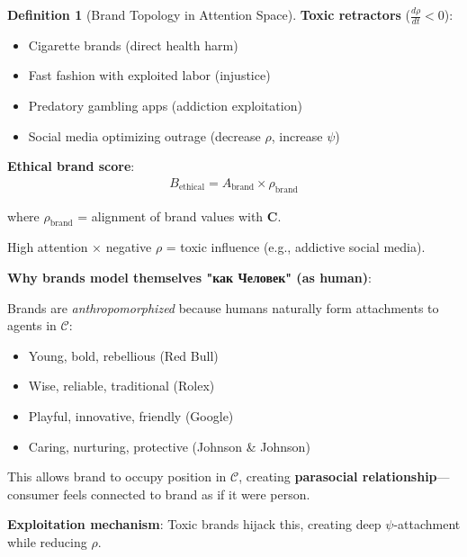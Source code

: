 \documentclass[11pt,a4paper]{article}
\theoremstyle{definition}
\newtheorem{definition}{Definition}[section]
\theoremstyle{remark}
\newcommand{\CC}{\mathcal{C}}
\begin{document}
\begin{enumerate}
\begin{definition}[Brand Topology in Attention Space]
\textbf{Toxic retractors} (\(\frac{d\rho}{dt} < 0\)):
\begin{itemize}
    \item Cigarette brands (direct health harm)
    \item Fast fashion with exploited labor (injustice)
    \item Predatory gambling apps (addiction exploitation)
    \item Social media optimizing outrage (decrease \(\rho\), increase \(\psi\))
\end{itemize}

\textbf{Ethical brand score}:
\begin{align}
B_{\text{ethical}} = A_{\text{brand}} \times \rho_{\text{brand}}
\end{align}

where \(\rho_{\text{brand}}\) = alignment of brand values with \(\mathbf{C}\).

High attention × negative \(\rho\) = toxic influence (e.g., addictive social media).

\textbf{Why brands model themselves "как Человек" (as human)}:

Brands are \textit{anthropomorphized} because humans naturally form attachments to agents in \(\CC\):
\begin{itemize}
    \item Young, bold, rebellious (Red Bull)
    \item Wise, reliable, traditional (Rolex)
    \item Playful, innovative, friendly (Google)
    \item Caring, nurturing, protective (Johnson \& Johnson)
\end{itemize}

This allows brand to occupy position in \(\CC\), creating \textbf{parasocial relationship}—consumer feels connected to brand as if it were person.

\textbf{Exploitation mechanism}: Toxic brands hijack this, creating deep \(\psi\)-attachment while reducing \(\rho\).
\end{definition}

\begin{figure}[H]
\centering
{}
\end{figure}
\end{enumerate}
\end{document}
